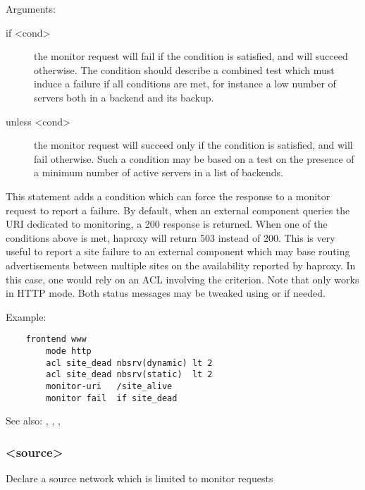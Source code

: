   Arguments:
\begin{description}
\item[if <cond>]
                  the monitor request will fail if the condition is satisfied,
                  and will succeed otherwise. The condition should describe a
                  combined test which must induce a failure if all conditions
                  are met, for instance a low number of servers both in a
                  backend and its backup.

\item[unless <cond>]
                  the monitor request will succeed only if the condition is
                  satisfied, and will fail otherwise. Such a condition may be
                  based on a test on the presence of a minimum number of active
                  servers in a list of backends.
\end{description}

  This statement adds a condition which can force the response to a monitor
  request to report a failure. By default, when an external component queries
  the URI dedicated to monitoring, a 200 response is returned. When one of the
  conditions above is met, haproxy will return 503 instead of 200. This is
  very useful to report a site failure to an external component which may base
  routing advertisements between multiple sites on the availability reported by
  haproxy. In this case, one would rely on an ACL involving the 
  criterion. Note that  only works in HTTP mode. Both status
  messages may be tweaked using  or  if needed.

  Example:
 \begin{verbatim}
    frontend www
        mode http
        acl site_dead nbsrv(dynamic) lt 2
        acl site_dead nbsrv(static)  lt 2
        monitor-uri   /site_alive
        monitor fail  if site_dead
\end{verbatim}


See also: , , , 

\subsubsection[monitor-net]{ <source>}

  Declare a source network which is limited to monitor requests



